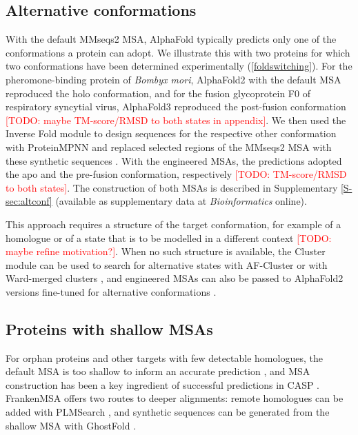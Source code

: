 \documentclass[webpdf,contemporary,large]{oup-authoring-template}%
\newcommand{\TODO}[1]{\textcolor{red}{[TODO: #1]}}
\newcommand{\suppl}{available as supplementary data at \textit{Bioinformatics} online}
\begin{document}
\subsection{Alternative conformations}
With the default MMseqs2 MSA, AlphaFold typically predicts only one of the conformations a protein can adopt.
We illustrate this with two proteins for which two conformations have been determined experimentally (\autoref{foldswitching}).
For the pheromone-binding protein of \textit{Bombyx mori}, AlphaFold2 with the default MSA reproduced the holo conformation, and for the fusion glycoprotein F0 of respiratory syncytial virus, AlphaFold3 reproduced the post-fusion conformation \TODO{maybe TM-score/RMSD to both states in appendix}.
We then used the Inverse Fold module to design sequences for the respective other conformation with ProteinMPNN and replaced selected regions of the MMseqs2 MSA with these synthetic sequences \cite{inverse_folding}.
With the engineered MSAs, the predictions adopted the apo and the pre-fusion conformation, respectively \TODO{TM-score/RMSD to both states}. The construction of both MSAs is described in Supplementary \autoref{S-sec:altconf} (\suppl).

This approach requires a structure of the target conformation, for example of a homologue or of a state that is to be modelled in a different context \TODO{maybe refine motivation?}.
When no such structure is available, the Cluster module can be used to search for alternative states with AF-Cluster \cite{af2_cluster} or with Ward-merged clusters \cite{italian_clustering}, and engineered MSAs can also be passed to AlphaFold2 versions fine-tuned for alternative conformations \cite{bryant_fold_switching}.

\subsection{Proteins with shallow MSAs}
For orphan proteins and other targets with few detectable homologues, the default MSA is too shallow to inform an accurate prediction \cite{plmsearch_application}, and MSA construction has been a key ingredient of successful predictions in CASP \cite{casp,casp_msa_engineering}.
FrankenMSA offers two routes to deeper alignments: remote homologues can be added with PLMSearch \cite{plmsearch}, and synthetic sequences can be generated from the shallow MSA with GhostFold \cite{ghostfold}.
\end{document}
